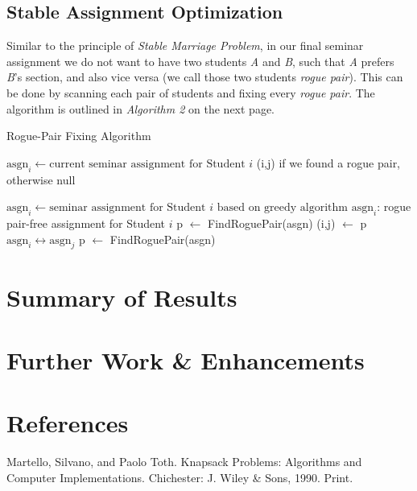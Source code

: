 \documentclass{article} %
\begin{document}
\subsection{Stable Assignment Optimization}
    \par Similar to the principle of \emph{Stable Marriage Problem}, in our final seminar assignment we do not want to have two students \emph{A} and \emph{B}, such that \emph{A} prefers \emph{B}'s section, and also vice versa (we call those two students \emph{rogue pair}). This can be done by scanning each pair of students and fixing every \emph{rogue pair}. The algorithm is outlined in \emph{Algorithm 2} on the next page.
    \begin{algorithm}
        \caption{Rogue-Pair Fixing Algorithm}
        \begin{algorithmic}
        \Require $\text{asgn}_i \gets \text{current seminar assignment for Student $i$}$
        \Ensure (i,j) if we found a rogue pair, otherwise null
                    \EndIf
                \EndFor
            \EndFor
        \EndFunction
        
        \null
        
        \Require $\text{asgn}_i \gets \text{seminar assignment for Student $i$ based on greedy algorithm}$
        \Ensure $\text{asgn}_i$: rogue pair-free assignment for Student $i$
                \State p $\gets$ FindRoguePair(asgn)
                    \State (i,j) $\gets$ p
                    \State $\text{asgn}_i \leftrightarrow \text{asgn}_j$
                    \State p $\gets$ FindRoguePair(asgn)
                \EndWhile
        
        \end{algorithmic}
    \end{algorithm}

%
%
\section{Summary of Results}

\section{Further Work \& Enhancements}

\section{References}
\begin{thebibliography}{9}

Martello, Silvano, and Paolo Toth. Knapsack Problems: Algorithms and Computer Implementations. Chichester: J. Wiley \& Sons, 1990. Print.
\end{thebibliography}
\end{document}
